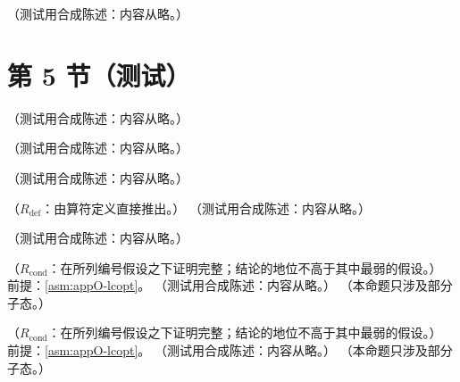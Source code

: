 \begin{definition}\label{def:appO-regulator-class}
（测试用合成陈述：内容从略。）
\end{definition}

\section{第 5 节（测试）}\label{sec:appO-localization}

\begin{lemma}[$k^+$ 围道的转动]\label{lem:appO-kplus-rotation}
（测试用合成陈述：内容从略。）
\end{lemma}

\begin{lemma}[射线恒等式]\label{lem:appO-ray-identity}
（测试用合成陈述：内容从略。）
\end{lemma}

\begin{lemma}[转动围道上双插入喷注函数的界]\label{lem:appO-two-insertion-bounds}
（测试用合成陈述：内容从略。）
\end{lemma}

\begin{lemma}\label{lem:appO-halfcoinc-colour}
（$R_{\mathrm{def}}$：由算符定义直接推出。）
（测试用合成陈述：内容从略。）
\end{lemma}

\begin{definition}[旁观者交换族与积分映射]\label{def:appO-family}
（测试用合成陈述：内容从略。）
\end{definition}

\begin{lemma}\label{lem:appO-side-independent-windows}
（$R_{\mathrm{cond}}$：在所列编号假设之下证明完整；结论的地位不高于其中最弱的假设。）
前提：\cref{asm:appO-lcopt}。
（测试用合成陈述：内容从略。）
（本命题只涉及部分子态。）
\end{lemma}

\begin{proposition}\label{prop:appO-ss-cancel}
（$R_{\mathrm{cond}}$：在所列编号假设之下证明完整；结论的地位不高于其中最弱的假设。）
前提：\cref{asm:appO-lcopt}。
（测试用合成陈述：内容从略。）
（本命题只涉及部分子态。）
\end{proposition}

